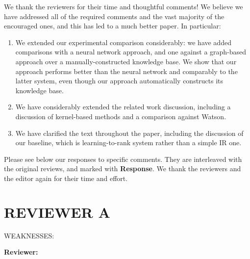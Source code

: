 \documentclass[10pt]{article}
\begin{document}
We thank the reviewers for their time and thoughtful comments! We believe we have addressed all of the required comments and the vast majority of the encouraged ones, and this has led to a much better paper. In particular:
\begin{enumerate}
\item We extended our experimental comparison considerably: we have added comparisons with a neural network approach, and one against a graph-based approach over a manually-constructed knowledge base. We show that our approach performs better than the neural network and comparably to the latter system, even though our approach automatically constructs its knowledge base.
\item We have considerably extended the related work discussion, including a discussion of kernel-based methods and a comparison against Watson.
\item We have clarified the text throughout the paper, including the discussion of our baseline, which is learning-to-rank system rather than a simple IR one. 
\end{enumerate}

Please see below our responses to specific comments. They are interleaved with the original reviews, and marked with {\bf Response}.
We thank the reviewers and the editor again for their time and effort.


\section{REVIEWER A}

WEAKNESSES:

{\flushleft \textbf{Reviewer:}}
\end{document}
